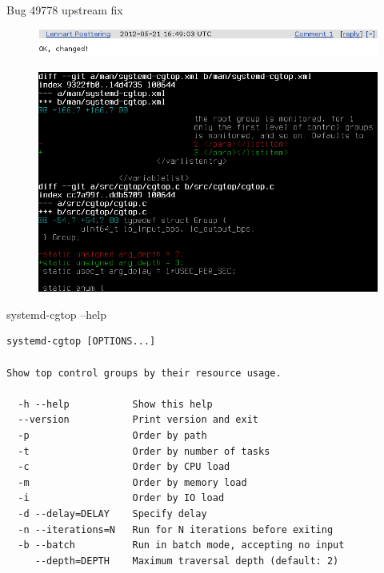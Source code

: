 \documentclass{beamer}
\begin{document}
\begin{frame}[fragile]{Bug 49778 upstream fix}
    \begin{figure}[htb]
        \includegraphics[width=1.0\textwidth]{comment.png}
    \end{figure}
    \begin{figure}[htb]
        \includegraphics[width=1.0\textwidth]{fix.png}
    \end{figure}
\end{frame}

\begin{frame}[fragile]{systemd-cgtop --help}
\begin{verbatim}
systemd-cgtop [OPTIONS...]

Show top control groups by their resource usage.

  -h --help           Show this help
  --version           Print version and exit
  -p                  Order by path
  -t                  Order by number of tasks
  -c                  Order by CPU load
  -m                  Order by memory load
  -i                  Order by IO load
  -d --delay=DELAY    Specify delay
  -n --iterations=N   Run for N iterations before exiting
  -b --batch          Run in batch mode, accepting no input
     --depth=DEPTH    Maximum traversal depth (default: 2)
\end{verbatim}
\end{frame}
\end{document}

